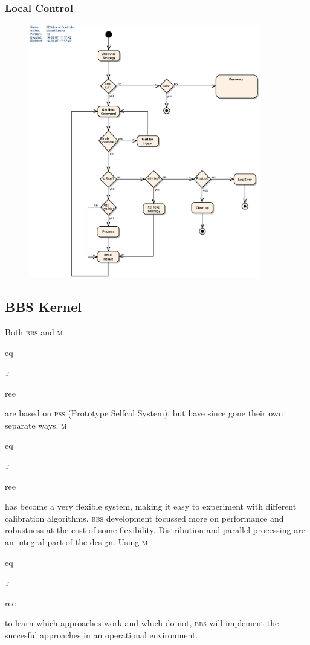 \documentclass[10pt]{lofar}
\newcommand{\bbs}{\textsc{bbs}\xspace}
\newcommand{\meqtree}{\textsc{m}\begin{footnotesize}eq\end{footnotesize}\textsc{t}\begin{footnotesize}ree\end{footnotesize}\xspace}
\begin{document}
\subsubsection{Local Control}
\label{subsubsec:design-local-control}
\begin{figure}[!ht]
\centering
\includegraphics[width=0.9\textwidth]{images/bbs-local-control-activity-diagram}
\end{figure}


\subsection{BBS Kernel}
\label{subsec:design-kernel}
Both \bbs and \meqtree are based on \textsc{pss} (Prototype Selfcal System), but have since gone their own separate ways. \meqtree has become a very flexible system, making it easy to experiment with different calibration algorithms. \bbs development focussed more on performance and robustness at the cost of some flexibility. Distribution and parallel processing are an integral part of the design. Using \meqtree to learn which approaches work and which do not, \bbs will implement the succesful approaches in an operational environment.
\end{document}
